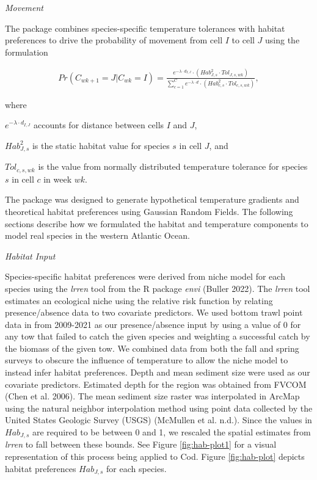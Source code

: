 \documentclass[
  12pt,
]{article}
\begin{document}
\emph{Movement}

The package combines species-specific temperature tolerances with habitat preferences to drive the probability of movement from cell \(I\) to cell \(J\) using the formulation

\begin{align}
Pr(C_{wk+1}=J|C_{wk}=I) = \frac{e^{-\lambda \cdot d_{I,J}}\cdot(Hab^2_{J,s} \cdot Tol_{J,s,wk})}{\sum^C_{c=1}e^{-\lambda \cdot d} \cdot (Hab^2_{c,s} \cdot Tol_{c,s,wk})},
\label{moveP}
\end{align}

where

\(e^{-\lambda \cdot d_{I,J}}\) accounts for distance between cells \(I\) and \(J\),

\(Hab^2_{J,s}\) is the static habitat value for species \(s\) in cell \(J\), and

\(Tol_{c,s,wk}\) is the value from normally distributed temperature tolerance for species \(s\) in cell \(c\) in week \(wk\).

The package was designed to generate hypothetical temperature gradients and theoretical habitat preferences using Gaussian Random Fields. The following sections describe how we formulated the habitat and temperature components to model real species in the western Atlantic Ocean.

\emph{Habitat Input}

Species-specific habitat preferences were derived from niche model for each species using the \emph{lrren} tool from the R package \emph{envi} (Buller 2022). The \emph{lrren} tool estimates an ecological niche using the relative risk function by relating presence/absence data to two covariate predictors. We used bottom trawl point data in from 2009-2021 as our presence/absence input by using a value of 0 for any tow that failed to catch the given species and weighting a successful catch by the biomass of the given tow. We combined data from both the fall and spring surveys to obscure the influence of temperature to allow the niche model to instead infer habitat preferences. Depth and mean sediment size were used as our covariate predictors. Estimated depth for the region was obtained from FVCOM (Chen et al. 2006). The mean sediment size raster was interpolated in ArcMap using the natural neighbor interpolation method using point data collected by the United States Geologic Survey (USGS) (McMullen et al. n.d.). Since the values in \(Hab_{J,s}\) are required to be between 0 and 1, we rescaled the spatial estimates from \emph{lrren} to fall between these bounds. See Figure \ref{fig:hab-plot1} for a visual representation of this process being applied to Cod. Figure \ref{fig:hab-plot} depicts habitat preferences \(Hab_{J,s}\) for each species.
\end{document}
